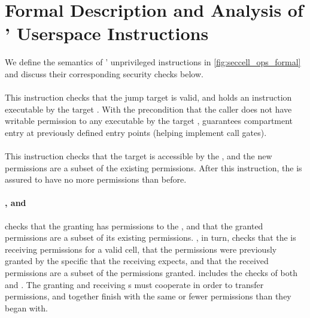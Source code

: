 \section{Formal Description and Analysis of \seccells' 
Userspace Instructions}
\label{app:instructions}

We define the semantics of \seccells' unprivileged instructions
in \autoref{fig:seccell_ops_formal} and discuss their corresponding
security checks below.

\paragraph{\sdswitch}
This instruction checks that the jump target is valid, and holds
an \sdentry instruction executable by the target \secdiv.
With the precondition that the caller \secdiv does not have
writable permission to any \cell executable by the target \secdiv,
\sdswitch guarantees compartment entry at previously defined entry 
points (helping implement call gates). 

\paragraph{\scprot}
This instruction checks that the target \cell is accessible by the
\secdiv, and the new permissions are a subset of the existing permissions.
After this instruction, the \secdiv is assured to have no more permissions
than before.

\paragraph{\scgrant, \screcv and \sctfer}
\scgrant checks that the granting \secdiv has permissions to the
\cell, and that the granted permissions are a subset of its existing
permissions.
\screcv, in turn, checks that the \secdiv is receiving permissions for a
valid cell, that the permissions were previously granted by the
specific \secdiv that the receiving \secdiv expects, and that the received
permissions are a subset of the permissions granted.
\sctfer includes the checks of both \scgrant and \scprot.
The granting and receiving \secdiv{}s must cooperate in order to
transfer permissions, and together finish with the same or fewer
permissions than they began with.

